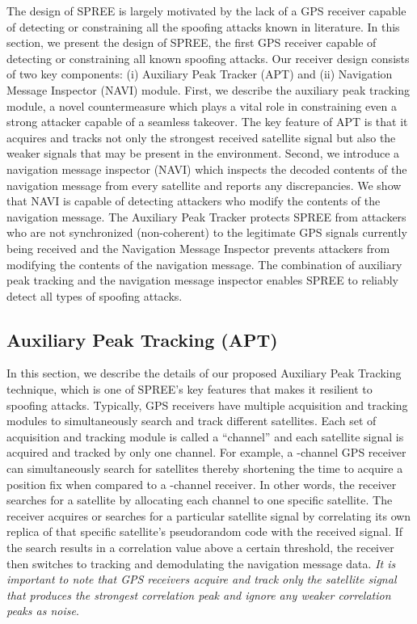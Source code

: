 \documentclass[letterpaper,twocolumn,10pt]{article}
\newcommand{\rxname}{SPREE\xspace}
\begin{document}
The design of \rxname is largely motivated by the lack of a GPS receiver capable of detecting or constraining all the spoofing attacks known in literature. In this section, we present the design of \rxname, the first GPS receiver capable of detecting or constraining all known spoofing attacks. Our receiver design consists of two key components: (i) Auxiliary Peak Tracker (APT) and (ii) Navigation Message Inspector (NAVI) module. First, we describe the auxiliary peak tracking module, a novel countermeasure which plays a vital role in constraining even a strong attacker capable of a seamless takeover. The key feature of APT is that it acquires and tracks not only the strongest received satellite signal but also the weaker signals that may be present in the environment. Second, we introduce a navigation message inspector (NAVI) which inspects the decoded contents of the navigation message from every satellite and reports any discrepancies. We show that NAVI is capable of detecting attackers who modify the contents of the navigation message. The Auxiliary Peak Tracker protects \rxname from attackers who are not synchronized (non-coherent) to the legitimate GPS signals currently being received and the Navigation Message Inspector prevents attackers from modifying the contents of the navigation message. The combination of auxiliary peak tracking and the navigation message inspector enables \rxname to reliably detect all types of spoofing attacks. 

\subsection{Auxiliary Peak Tracking (APT)}
In this section, we describe the details of our proposed Auxiliary Peak Tracking technique, which is one of \rxname's key features that makes it resilient to spoofing attacks. Typically, GPS receivers have multiple acquisition and tracking modules to simultaneously search and track different satellites. Each set of acquisition and tracking module is called a “channel” and each satellite signal is acquired and tracked by only one channel. For example, a -channel GPS receiver can simultaneously search for  satellites thereby shortening the time to acquire a position fix when compared to a -channel receiver. In other words, the receiver searches for a satellite by allocating each channel to one specific satellite. The receiver acquires or searches for a particular satellite signal by correlating its own replica of that specific satellite's pseudorandom code with the received signal. If the search results in a correlation value above a certain threshold, the receiver then switches to tracking and demodulating the navigation message data. \textit{It is important to note that GPS receivers acquire and track only the satellite signal that produces the strongest correlation peak and ignore any weaker correlation peaks as noise}.
\end{document}
